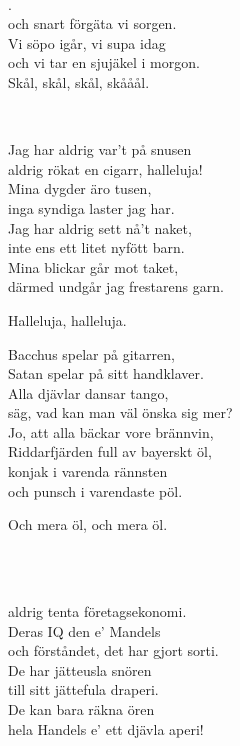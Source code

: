 {{ \\ 
\author{Text: Torsten Hummel-Gumælius}

\leftrepeat {}.\\
och snart förgäta vi sorgen.\\
Vi söpo igår, vi supa idag\\
och vi tar en sjujäkel i morgon. \rightrepeat\\
Skål, skål, skål, skååål.\\

\newpage 


 \\       

\songtext{}
Jag har aldrig var't på snusen\\
aldrig rökat en cigarr, halleluja!\\
Mina dygder äro tusen,\\
inga syndiga laster jag har.\\
Jag har aldrig sett nå't naket,\\
inte ens ett litet nyfött barn.\\
Mina blickar går mot taket,\\
därmed undgår jag frestarens garn.

\leftrepeat Halleluja, halleluja. \rightrepeat

Bacchus spelar på gitarren,\\
Satan spelar på sitt handklaver.\\
Alla djävlar dansar tango,\\
säg, vad kan man väl önska sig mer?\\
Jo, att alla bäckar vore brännvin,\\
Riddarfjärden full av bayerskt öl,\\
konjak i varenda rännsten\\
och punsch i varendaste pöl.

\leftrepeat Och mera öl, och mera öl. \rightrepeat

\newpage


 \\       

\\
aldrig tenta företagsekonomi.\\
Deras IQ den e' Mandels\\
och förståndet, det har gjort sorti.\\
De har jätteusla snören\\
till sitt jättefula draperi.\\
De kan bara räkna ören\\
hela Handels e' ett djävla aperi!

}}
